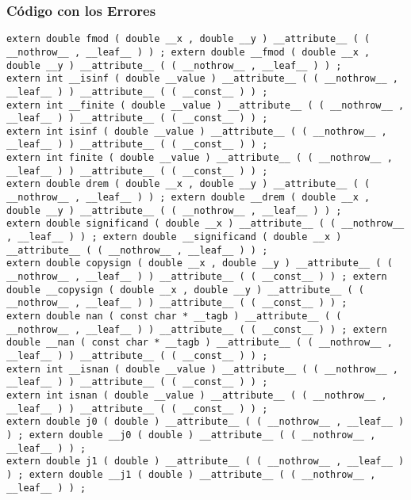 \documentclass{beamer}
\begin{document}
\begin{frame}[fragile]
\frametitle{C\'odigo con los Errores}
\begin{verbatim}
extern double fmod ( double __x , double __y ) __attribute__ ( ( __nothrow__ , __leaf__ ) ) ; extern double __fmod ( double __x , double __y ) __attribute__ ( ( __nothrow__ , __leaf__ ) ) ; 
extern int __isinf ( double __value ) __attribute__ ( ( __nothrow__ , __leaf__ ) ) __attribute__ ( ( __const__ ) ) ; 
extern int __finite ( double __value ) __attribute__ ( ( __nothrow__ , __leaf__ ) ) __attribute__ ( ( __const__ ) ) ; 
extern int isinf ( double __value ) __attribute__ ( ( __nothrow__ , __leaf__ ) ) __attribute__ ( ( __const__ ) ) ; 
extern int finite ( double __value ) __attribute__ ( ( __nothrow__ , __leaf__ ) ) __attribute__ ( ( __const__ ) ) ; 
extern double drem ( double __x , double __y ) __attribute__ ( ( __nothrow__ , __leaf__ ) ) ; extern double __drem ( double __x , double __y ) __attribute__ ( ( __nothrow__ , __leaf__ ) ) ; 
extern double significand ( double __x ) __attribute__ ( ( __nothrow__ , __leaf__ ) ) ; extern double __significand ( double __x ) __attribute__ ( ( __nothrow__ , __leaf__ ) ) ; 
extern double copysign ( double __x , double __y ) __attribute__ ( ( __nothrow__ , __leaf__ ) ) __attribute__ ( ( __const__ ) ) ; extern double __copysign ( double __x , double __y ) __attribute__ ( ( __nothrow__ , __leaf__ ) ) __attribute__ ( ( __const__ ) ) ; 
extern double nan ( const char * __tagb ) __attribute__ ( ( __nothrow__ , __leaf__ ) ) __attribute__ ( ( __const__ ) ) ; extern double __nan ( const char * __tagb ) __attribute__ ( ( __nothrow__ , __leaf__ ) ) __attribute__ ( ( __const__ ) ) ; 
extern int __isnan ( double __value ) __attribute__ ( ( __nothrow__ , __leaf__ ) ) __attribute__ ( ( __const__ ) ) ; 
extern int isnan ( double __value ) __attribute__ ( ( __nothrow__ , __leaf__ ) ) __attribute__ ( ( __const__ ) ) ; 
extern double j0 ( double ) __attribute__ ( ( __nothrow__ , __leaf__ ) ) ; extern double __j0 ( double ) __attribute__ ( ( __nothrow__ , __leaf__ ) ) ; 
extern double j1 ( double ) __attribute__ ( ( __nothrow__ , __leaf__ ) ) ; extern double __j1 ( double ) __attribute__ ( ( __nothrow__ , __leaf__ ) ) ; 
\end{verbatim}
\end{frame}
\end{document}
